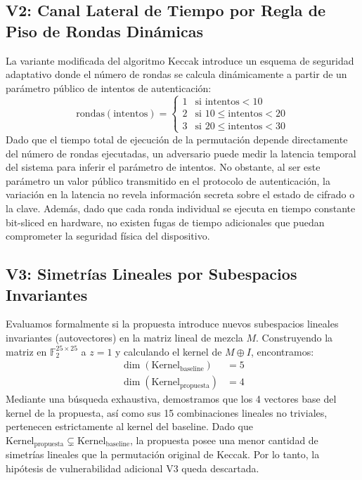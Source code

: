 \documentclass[journal,compsoc]{IEEEtran}
\begin{document}
\subsection{V2: Canal Lateral de Tiempo por Regla de Piso de Rondas Dinámicas}
La variante modificada del algoritmo Keccak introduce un esquema de seguridad adaptativo donde el número de rondas se calcula dinámicamente a partir de un parámetro público de intentos de autenticación:
\begin{equation}
    \text{rondas}(\text{intentos}) = \begin{cases}
        1 & \text{si } \text{intentos} < 10 \\
        2 & \text{si } 10 \le \text{intentos} < 20 \\
        3 & \text{si } 20 \le \text{intentos} < 30
    \end{cases}
\end{equation}
Dado que el tiempo total de ejecución de la permutación depende directamente del número de rondas ejecutadas, un adversario puede medir la latencia temporal del sistema para inferir el parámetro de intentos. No obstante, al ser este parámetro un valor público transmitido en el protocolo de autenticación, la variación en la latencia no revela información secreta sobre el estado de cifrado o la clave. Además, dado que cada ronda individual se ejecuta en tiempo constante bit-sliced en hardware, no existen fugas de tiempo adicionales que puedan comprometer la seguridad física del dispositivo.

\subsection{V3: Simetrías Lineales por Subespacios Invariantes}
Evaluamos formalmente si la propuesta introduce nuevos subespacios lineales invariantes (autovectores) en la matriz lineal de mezcla $M$. Construyendo la matriz en $\mathbb{F}_2^{25 \times 25}$ a $z=1$ y calculando el kernel de $M \oplus I$, encontramos:
\begin{align}
    \dim(\text{Kernel}_{\text{baseline}}) &= 5 \\
    \dim(\text{Kernel}_{\text{propuesta}}) &= 4
\end{align}
Mediante una búsqueda exhaustiva, demostramos que los 4 vectores base del kernel de la propuesta, así como sus 15 combinaciones lineales no triviales, pertenecen estrictamente al kernel del baseline. Dado que $\text{Kernel}_{\text{propuesta}} \subsetneq \text{Kernel}_{\text{baseline}}$, la propuesta posee una menor cantidad de simetrías lineales que la permutación original de Keccak. Por lo tanto, la hipótesis de vulnerabilidad adicional V3 queda descartada.
\end{document}
